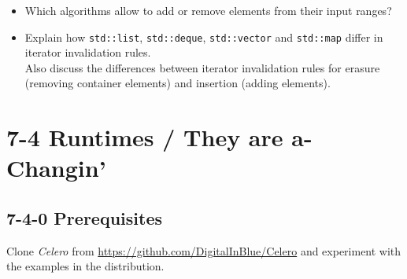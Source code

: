 \documentclass[]{article}
\providecommand{\tightlist}{%
  \setlength{\itemsep}{0pt}\setlength{\parskip}{0pt}}
\begin{document}
\begin{itemize}
\tightlist
\item
  Which algorithms allow to add or remove elements from their input
  ranges?
\item
  Explain how \texttt{std::list}, \texttt{std::deque},
  \texttt{std::vector} and \texttt{std::map} differ in iterator
  invalidation rules.\\
   Also discuss the differences between iterator invalidation rules for
  erasure (removing container elements) and insertion (adding elements).
\end{itemize}

\section{7-4 Runtimes / They are
a-Changin'}\label{runtimes-they-are-a-changin}

\subsection{7-4-0 Prerequisites}\label{prerequisites}

Clone \emph{Celero} from \url{https://github.com/DigitalInBlue/Celero}
and experiment with the examples in the distribution.
\end{document}
